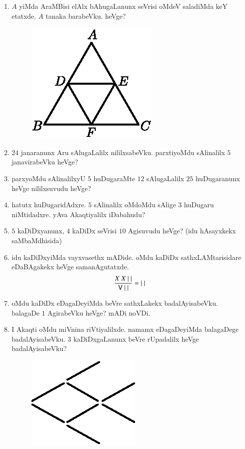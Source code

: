 \begin{enumerate}
\item $A$ yiMda AraMBisi elAlx bAhugaLanunx seVrisi oMdeV saladiMda keY etatxde. $A$ tanaka barabeVku. heVge?
\begin{figure}[H]
\centering
\includegraphics{src/figures/exr34.eps}
\end{figure}

\item $24$ janaranunx Aru sAlugaLalilx nililxsabeVku. parxtiyoMdu sAlinalilx $5$ janavirabeVku heVge?

\item parxyoMdu sAlinalilxyU $5$ huDugaraMte $12$ sAlugaLalilx $25$ huDuga\-ranunx heVge nililxsuvudu heVge?

\item hatutx huDugaridAdxre. $5$ sAlinalilx oMdoMdu sAlige $3$ huDugaru niMtidadxre. yAva Akaqtiyalilx iDabahudu?

\item $5$ kaDiDxyanunx, $4$ kaDiDx seVrisi $10$ Agisuvudu heVge? (idu hAsayxkekx saMbaMdhisida)

\item idu kaDiDxyiMda vayxvasethx mADide. oMdu kaDiDx sathxLAMtarisidare eDaBAgakekx heVge samanAgutatxde.
$$
\frac{X \ X \ |~|}{{\sf V}~|~|}=|~|
$$

\item oMdu kaDiDx eDagaDeyiMda beVre sathxLakekx badalAyisabeVku. balagaDe $1$ AgirabeVku heVge? mADi noVDi.

\eject


\item I Akaqti oMdu miVnina riVtiyalilxde. namamx eDagaDeyiMda balagaDege badalAyisabeVku. $3$ kaDiDxgaLanunx beVre rUpadalilx heVge badalAyisabeVku?
\begin{figure}[H]
\centering
\includegraphics{src/figures/exr41.eps}
\end{figure}


\end{enumerate}
